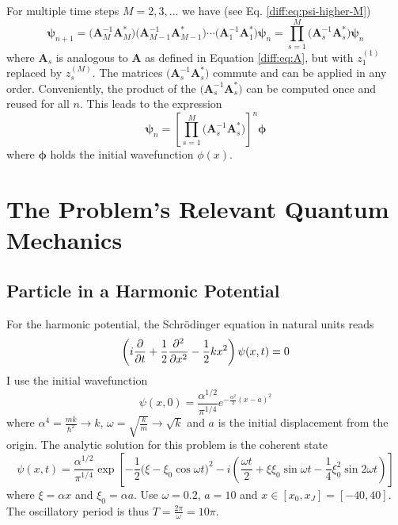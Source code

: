 \documentclass[11pt, a4paper]{article}
\newcommand{\mat}[1]{\mathbf{#1}}
\newcommand{\schro}{Schr\"{o}dinger\xspace}
\begin{document}
\vspace{2mm}
For multiple time steps $ M = 2, 3, \ldots $ we have (see Eq. \ref{diff:eq:psi-higher-M})
\begin{equation*}
	\bm{\psi}_{n+1} = \big(\mat{A}_{M}^{-1}\mat{A}_{M}^{*}\big)\big(\mat{A}_{M-1}^{-1}\mat{A}_{M-1}^{*}\big)\cdots \big(\mat{A}_{1}^{-1}\mat{A}_{1}^{*}\big)\bm{\psi}_{n} = \prod_{s=1}^{M}\big(\mat{A}_{s}^{-1}\mat{A}_{s}^{*}\big) \bm{\psi}_{n}
\end{equation*}
where $ \mat{A}_{s} $ is analogous to $ \mat{A} $ as defined in Equation \ref{diff:eq:A}, but with $ z_{1}^{(1)} $ replaced by $ z_{s}^{(M)} $. The matrices $ \big(\mat{A}_{s}^{-1}\mat{A}_{s}^{*}\big) $ commute and can be applied in any order. Conveniently, the product of the $ \big(\mat{A}_{s}^{-1}\mat{A}_{s}^{*}\big) $ can be computed once and reused for all $ n $. This leads to the expression
\begin{equation*}
	\bm{\psi}_{n} = \left[\prod_{s=1}^{M}\big(\mat{A}_{s}^{-1}\mat{A}_{s}^{*}\big)\right]^{n} \bm{\phi}
\end{equation*}
where $ \bm{\phi} $ holds the initial wavefunction $ \phi(x) $.

\section{The Problem's Relevant Quantum Mechanics}
\subsection{Particle in a Harmonic Potential}
For the harmonic potential, the \schro equation in natural units reads
\begin{equation*}
	\left(i \pdv{t} + \frac{1}{2}\pdv[2]{}{x} - \frac{1}{2}kx^{2} \right) \psi(x, t) = 0
\end{equation*}
I use the initial wavefunction
\begin{equation*}
	\psi(x, 0) = \frac{\alpha^{1/2}}{\pi^{1/4}}e^{-\frac{\alpha^{2}}{2}(x - a)^{2}}
\end{equation*}
where $ \alpha^{4} = \frac{mk}{\hbar^{2}} \to k $, $ \omega = \sqrt{\frac{k}{m}} \to \sqrt{k} $ and $ a $ is the initial displacement from the origin. The analytic solution for this problem is the coherent state
\begin{equation*}
	\psi(x, t) = \frac{\alpha^{1/2}}{\pi^{1/4}}\exp \left[-\frac{1}{2}\big(\xi - \xi_{0}\cos \omega t \big)^{2} - i\left(\frac{\omega t}{2} + \xi \xi_{0} \sin \omega t - \frac{1}{4}\xi_{0}^{2}\sin 2\omega t\right)\right]
\end{equation*}
where $ \xi = \alpha x $ and $ \xi_{0} = \alpha a $. Use $ \omega = 0.2 $, $ a = 10 $ and $ x \in [x_{0}, x_{J}] = [-40, 40] $. The oscillatory period is thus $ T = \frac{2\pi}{\omega} = 10\pi $.
\end{document}
